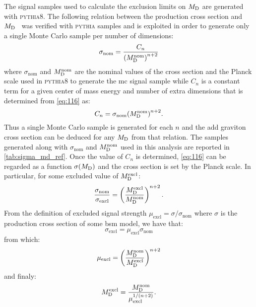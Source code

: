 The signal samples used to calculate the exclusion limits on $M_\mathrm{D}$ are generated
with \textsc{pythia8}. The following relation between the production cross
section and $M_\mathrm{D}$~\cite{ADDPhenomenology} was verified with \textsc{pythia}
samples and is exploited in order to generate only a single Monte Carlo sample
per number of dimensions:
\begin{equation}
  \label{eq:116}
  \sigma_\mathrm{nom} = \frac{C_n}{{(M_\mathrm{D}^\mathrm{nom})}^{n + 2}}
\end{equation}
where $\sigma_\mathrm{nom}$ and $M_\mathrm{D}^\mathrm{nom}$ are the nominal values of the
cross section and the Planck scale used in \textsc{pythia8} to generate the
\gls{mc} signal sample while $C_n$ is a constant term for a given center of mass
energy and number of extra dimensions that is determined from \cref{eq:116} as:
\begin{equation}
  \label{eq:179}
  C_n = \sigma_\mathrm{nom} {(M_\mathrm{D}^\mathrm{nom})}^{n + 2}.
\end{equation}
Thus a single Monte Carlo sample is generated for each $n$ and the \gls{add}
graviton cross section can be deduced for any $M_\mathrm{D}$ from that relation. The
samples generated along with $\sigma_\mathrm{nom}$ and $M_\mathrm{D}^\mathrm{nom}$ used
in this analysis are reported in \cref{tab:sigma_md_ref}. Once the value of
$C_n$ is determined, \cref{eq:116} can be regarded as a function $\sigma(M_\mathrm{D})$
and the cross section is set by the Planck scale. In particular, for some
excluded value of $M_\mathrm{D}^\mathrm{excl}$:
\begin{equation}
  \label{eq:180}
  \frac{\sigma_\mathrm{nom}}{\sigma_\mathrm{excl}} = \left(
    \frac{M_\mathrm{D}^\mathrm{excl}}{M_\mathrm{D}^\mathrm{nom}} \right)^{n + 2}.
\end{equation}
From the definition of excluded signal strength
$\mu_\mathrm{excl} = \sigma/\sigma_\mathrm{nom}$ where $\sigma$ is the
production cross section of some \gls{bsm} model, we have that:
\begin{equation}
  \label{eq:181}
  \sigma_\mathrm{excl} = \mu_\mathrm{excl} \sigma_\mathrm{nom}
\end{equation}
from which:
\begin{equation}
  \label{eq:182}
  \mu_\mathrm{excl} = \left( \frac{M_\mathrm{D}^\mathrm{nom}}{M_\mathrm{D}^\mathrm{excl}}
  \right)^{n + 2}
\end{equation}
and finaly:
\begin{equation}
  \label{eq:117}
  M_\mathrm{D}^\mathrm{excl} = \frac{M_\mathrm{D}^\mathrm{nom}}{\mu^{1/(n + 2)}_\mathrm{excl}}.
\end{equation}
